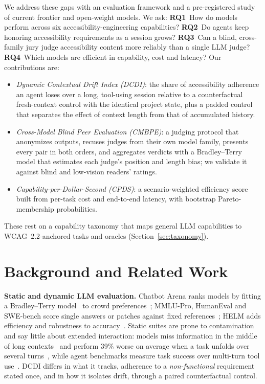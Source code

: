 \documentclass[10pt,conference]{IEEEtran}
\begin{document}
We address these gaps with an evaluation framework and a pre-registered study of current frontier and open-weight models. We ask: \textbf{RQ1}~How do models perform across six accessibility-engineering capabilities? \textbf{RQ2}~Do agents keep honoring accessibility requirements as a session grows? \textbf{RQ3}~Can a blind, cross-family jury judge accessibility content more reliably than a single LLM judge? \textbf{RQ4}~Which models are efficient in capability, cost and latency? Our contributions are:
\begin{itemize}
\item \emph{Dynamic Contextual Drift Index (DCDI)}: the share of accessibility adherence an agent loses over a long, tool-using session relative to a counterfactual fresh-context control with the identical project state, plus a padded control that separates the effect of context length from that of accumulated history.
\item \emph{Cross-Model Blind Peer Evaluation (CMBPE)}: a judging protocol that anonymizes outputs, recuses judges from their own model family, presents every pair in both orders, and aggregates verdicts with a Bradley--Terry model that estimates each judge's position and length bias; we validate it against blind and low-vision readers' ratings.
\item \emph{Capability-per-Dollar-Second (CPDS)}: a scenario-weighted efficiency score built from per-task cost and end-to-end latency, with bootstrap Pareto-membership probabilities.
\end{itemize}
These rest on a capability taxonomy that maps general LLM capabilities to WCAG~2.2-anchored tasks and oracles (Section~\ref{sec:taxonomy}). 

\section{Background and Related Work}

\textbf{Static and dynamic LLM evaluation.} Chatbot Arena ranks models by fitting a Bradley--Terry model~\cite{bradley1952rank} to crowd preferences~\cite{chiang2024arena}; MMLU-Pro, HumanEval and SWE-bench score single answers or patches against fixed references~\cite{wang2024mmlupro,chen2021humaneval,jimenez2024swebench}; HELM adds efficiency and robustness to accuracy~\cite{liang2023helm}. Static suites are prone to contamination~\cite{sainz2023contamination} and say little about extended interaction: models miss information in the middle of long contexts~\cite{liu2024lost,hsieh2024ruler} and perform 39\% worse on average when a task unfolds over several turns~\cite{laban2025lost}, while agent benchmarks measure task success over multi-turn tool use~\cite{yao2024taubench}. DCDI differs in what it tracks, adherence to a \emph{non-functional} requirement stated once, and in how it isolates drift, through a paired counterfactual control.
\end{document}
